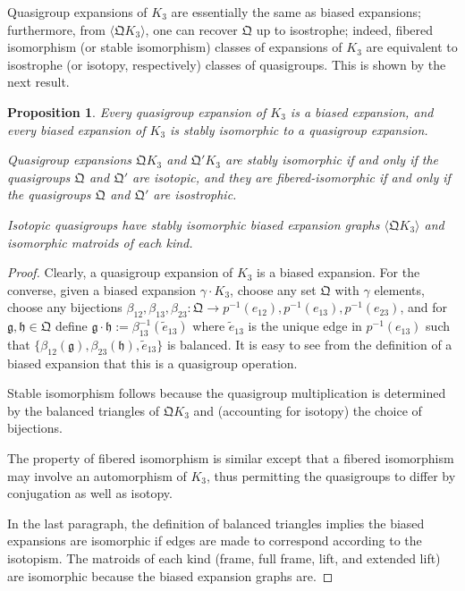 \documentclass[reqno,12pt]{amsart}
\newtheorem{prop}[thm]{Proposition}
\theoremstyle{remark}
\numberwithin{equation}{section}
\numberwithin{figure}{section}
\newcommand \inv{^{-1}}
\newcommand \bgr[1]{\langle#1\rangle}
\newcommand \fQ{\mathfrak Q}
\newcommand \te{{\tilde e}}
\newcommand\Qg{\mathfrak g}
\newcommand\Qh{\mathfrak h}
\begin{document}
Quasigroup expansions of $K_3$ are essentially the same as biased expansions; furthermore, from $\bgr{\fQ K_3}$, one can recover $\fQ$ up to isostrophe; indeed, fibered isomorphism (or stable isomorphism) classes of expansions of $K_3$ are equivalent to isostrophe (or isotopy, respectively) classes of quasigroups.  This is shown by the next result.

\begin{prop}\label{P:isotopism}
Every quasigroup expansion of $K_3$ is a biased expansion, and every biased expansion of $K_3$ is stably isomorphic to a quasigroup expansion.  

Quasigroup expansions $\fQ K_3$ and $\fQ' K_3$ are stably isomorphic if and only if the quasigroups $\fQ$ and $\fQ'$ are isotopic, and they are fibered-isomorphic if and only if the quasigroups $\fQ$ and $\fQ'$ are isostrophic.

Isotopic quasigroups have stably isomorphic biased expansion graphs $\bgr{\fQ K_3}$ and isomorphic matroids of each kind.
\end{prop}

\begin{proof}
Clearly, a quasigroup expansion of $K_3$ is a biased expansion.  For the converse, given a biased expansion $\gamma\cdot K_3$, choose any set $\fQ$ with $\gamma$ elements, choose any bijections $\beta_{12}, \beta_{13}, \beta_{23}:  \fQ \to p\inv(e_{12}), p\inv(e_{13}), p\inv(e_{23})$, and for $\Qg, \Qh \in \fQ$ define $\Qg \cdot \Qh := \beta_{13}\inv(\te_{13})$ where $\te_{13}$ is the unique edge in $p\inv(e_{13})$ such that $\{\beta_{12}(\Qg),\beta_{23}(\Qh), \te_{13}\}$ is balanced.  It is easy to see from the definition of a biased expansion that this is a quasigroup operation.

Stable isomorphism follows because the quasigroup multiplication is determined by the balanced triangles of $\fQ K_3$ and (accounting for isotopy) the choice of bijections.  

The property of fibered isomorphism is similar except that a fibered isomorphism may involve an automorphism of $K_3$, thus permitting the quasigroups to differ by conjugation as well as isotopy.

In the last paragraph, the definition of balanced triangles implies the biased expansions are isomorphic if edges are made to correspond according to the isotopism.  The matroids of each kind (frame, full frame, lift, and extended lift) are isomorphic because the biased expansion graphs are.
\end{proof}
\end{document}
